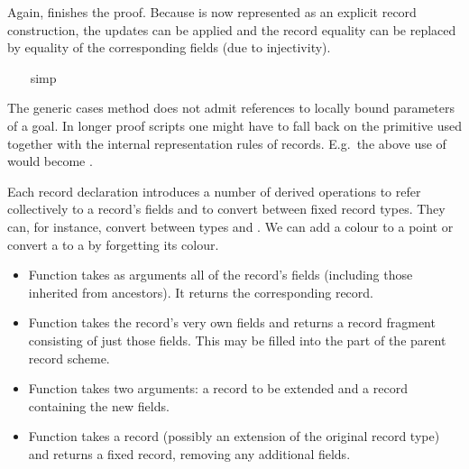 \begin{isabellebody}
\begin{isamarkuptxt}
\begin{isabelle}
\end{isabelle} Again,  finishes the proof.  Because  is now represented as
  an explicit record construction, the updates can be applied and the
  record equality can be replaced by equality of the corresponding
  fields (due to injectivity).%
\end{isamarkuptxt}%
\ \ \isamarkuptrue%
\ simp\isanewline
\ \ \isamarkupfalse%
\isamarkupfalse%
%
\begin{isamarkuptext}%
The generic cases method does not admit references to locally bound
  parameters of a goal.  In longer proof scripts one might have to
  fall back on the primitive  used together with the
  internal representation rules of records.  E.g.\ the above use of
   would become .%
\end{isamarkuptext}%
\isamarkuptrue%
%
\isamarkuptrue%
%
\begin{isamarkuptext}%
Each record declaration introduces a number of derived operations to
  refer collectively to a record's fields and to convert between fixed
  record types.  They can, for instance, convert between types  and .  We can add a colour to a point or convert
  a  to a  by forgetting its colour.

  \begin{itemize}

  \item Function  takes as arguments all of the record's
  fields (including those inherited from ancestors).  It returns the
  corresponding record.

  \item Function  takes the record's very own fields and
  returns a record fragment consisting of just those fields.  This may
  be filled into the  part of the parent record scheme.

  \item Function  takes two arguments: a record to be
  extended and a record containing the new fields.

  \item Function  takes a record (possibly an extension
  of the original record type) and returns a fixed record, removing
  any additional fields.


\end{itemize}
\end{isamarkuptext}
\end{isabellebody}
